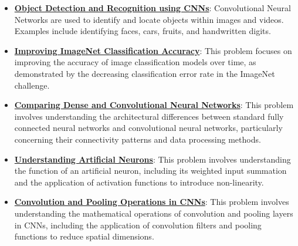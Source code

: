 \documentclass{article}%
\begin{document}
\begin{itemize}[leftmargin=*]%
\item \href{https://purdue.brightspace.com/d2l/common/assets/pdfjs-d2l-dist/1.0.14-legacy/web/viewer.html?file=\%2Fcontent\%2Fenforced\%2F1095467-wl.202510.CS.24300.001\%2F09L1-cnn.pdf\%3Fou\%3D1095467\&lang=en-us\&container=d2l-fileviewer-rendered-pdf\&fullscreen=d2l-fileviewer-rendered-pdf-dialog\&height=667#page=2}{\textbf{Object Detection and Recognition using CNNs}}: Convolutional Neural Networks are used to identify and locate objects within images and videos. Examples include identifying faces, cars, fruits, and handwritten digits.%
\item \href{https://purdue.brightspace.com/d2l/common/assets/pdfjs-d2l-dist/1.0.14-legacy/web/viewer.html?file=\%2Fcontent\%2Fenforced\%2F1095467-wl.202510.CS.24300.001\%2F09L1-cnn.pdf\%3Fou\%3D1095467\&lang=en-us\&container=d2l-fileviewer-rendered-pdf\&fullscreen=d2l-fileviewer-rendered-pdf-dialog\&height=667#page=3}{\textbf{Improving ImageNet Classification Accuracy}}: This problem focuses on improving the accuracy of image classification models over time, as demonstrated by the decreasing classification error rate in the ImageNet challenge.%
\item \href{https://purdue.brightspace.com/d2l/common/assets/pdfjs-d2l-dist/1.0.14-legacy/web/viewer.html?file=\%2Fcontent\%2Fenforced\%2F1095467-wl.202510.CS.24300.001\%2F09L1-cnn.pdf\%3Fou\%3D1095467\&lang=en-us\&container=d2l-fileviewer-rendered-pdf\&fullscreen=d2l-fileviewer-rendered-pdf-dialog\&height=667#page=4}{\textbf{Comparing Dense and Convolutional Neural Networks}}: This problem involves understanding the architectural differences between standard fully connected neural networks and convolutional neural networks, particularly concerning their connectivity patterns and data processing methods.%
\item \href{https://purdue.brightspace.com/d2l/common/assets/pdfjs-d2l-dist/1.0.14-legacy/web/viewer.html?file=\%2Fcontent\%2Fenforced\%2F1095467-wl.202510.CS.24300.001\%2F09L1-cnn.pdf\%3Fou\%3D1095467\&lang=en-us\&container=d2l-fileviewer-rendered-pdf\&fullscreen=d2l-fileviewer-rendered-pdf-dialog\&height=667#page=5}{\textbf{Understanding Artificial Neurons}}: This problem involves understanding the function of an artificial neuron, including its weighted input summation and the application of activation functions to introduce non-linearity.%
\item \href{https://purdue.brightspace.com/d2l/common/assets/pdfjs-d2l-dist/1.0.14-legacy/web/viewer.html?file=\%2Fcontent\%2Fenforced\%2F1095467-wl.202510.CS.24300.001\%2F09L1-cnn.pdf\%3Fou\%3D1095467\&lang=en-us\&container=d2l-fileviewer-rendered-pdf\&fullscreen=d2l-fileviewer-rendered-pdf-dialog\&height=667#page=6}{\textbf{Convolution and Pooling Operations in CNNs}}: This problem involves understanding the mathematical operations of convolution and pooling layers in CNNs, including the application of convolution filters and pooling functions to reduce spatial dimensions.%

\end{itemize}
\end{document}
